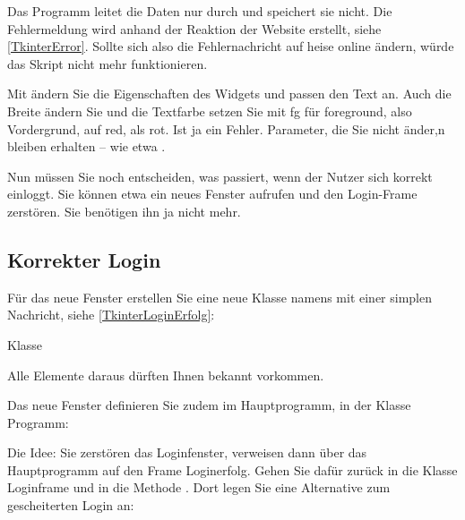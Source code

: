 Das Programm leitet die Daten nur durch und speichert sie nicht. Die Fehlermeldung wird anhand der Reaktion der Website erstellt, siehe \ref{TkinterError}. Sollte sich also die Fehlernachricht auf heise online ändern, würde das Skript nicht mehr funktionieren.

Mit  ändern Sie die Eigenschaften des Widgets und passen den Text an. Auch die Breite ändern Sie und die Textfarbe setzen Sie mit fg für foreground, also Vordergrund, auf red, als rot. Ist ja ein Fehler. Parameter, die Sie nicht änder,n bleiben erhalten -- wie etwa .

Nun müssen Sie noch entscheiden, was passiert, wenn der Nutzer sich korrekt einloggt. Sie können etwa ein neues Fenster aufrufen und den Login-Frame zerstören. Sie benötigen ihn ja nicht mehr.


\subsection{Korrekter Login}


Für das neue Fenster erstellen Sie eine neue Klasse namens  mit einer simplen Nachricht, siehe \ref{TkinterLoginErfolg}:

\begin{code}
     
    \caption{Klasse }\label{TkinterLoginErfolg}
\end{code}   


Alle Elemente daraus dürften Ihnen bekannt vorkommen.

Das neue Fenster definieren Sie zudem im Hauptprogramm, in der Klasse Programm:

\medskip


\medskip

Die Idee: Sie zerstören das Loginfenster, verweisen dann über das Hauptprogramm auf den Frame Loginerfolg. Gehen Sie dafür zurück in die Klasse Loginframe und in die Methode . Dort legen Sie eine Alternative zum gescheiterten Login an:

\medskip




